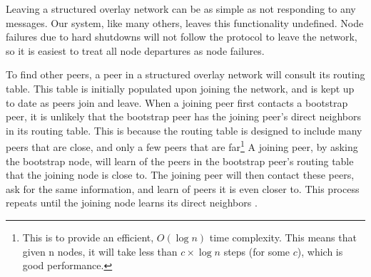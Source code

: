\documentclass[12pt]{report}
\begin{document}

Leaving a structured overlay network can be as simple as not responding to any messages. Our system, like many others, leaves this functionality undefined. Node failures due to hard shutdowns will not follow the protocol to leave the network, so it is easiest to treat all node departures as node failures. 

To find other peers, a peer in a structured overlay network will consult its routing table. This table is initially populated upon joining the network, and is kept up to date as peers join and leave. When a joining peer first contacts a bootstrap peer, it is unlikely that the bootstrap peer has the joining peer's direct neighbors in its routing table. This is because the routing table is designed to include many peers that are close, and only a few peers that are far\footnote{This is to provide an efficient, $O(\log n)$ time complexity. This means that given n nodes, it will take less than $c \times \log n$ steps (for some $c$), which is good performance.} A joining peer, by asking the bootstrap node, will learn of the peers in the bootstrap peer's routing table that the joining node is close to. The joining peer will then contact these peers, ask for the same information, and learn of peers it is even closer to. This process repeats until the joining node learns its direct neighbors \cite{p2pSurvey}.
\end{document}
